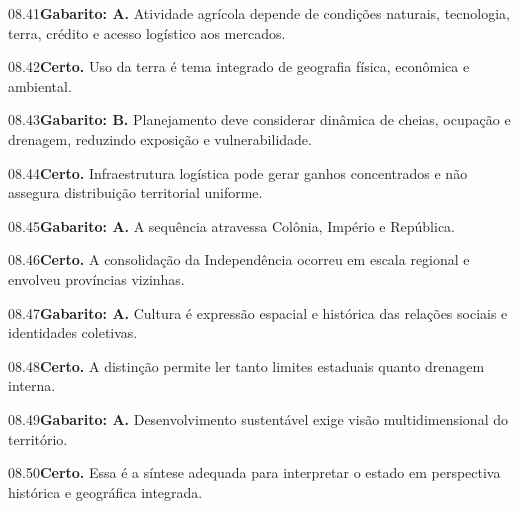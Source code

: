 \begin{solucao}{08.41}\textbf{Gabarito: A.} Atividade agrícola depende de condições naturais, tecnologia, terra, crédito e acesso logístico aos mercados.\end{solucao}
\begin{solucao}{08.42}\textbf{Certo.} Uso da terra é tema integrado de geografia física, econômica e ambiental.\end{solucao}
\begin{solucao}{08.43}\textbf{Gabarito: B.} Planejamento deve considerar dinâmica de cheias, ocupação e drenagem, reduzindo exposição e vulnerabilidade.\end{solucao}
\begin{solucao}{08.44}\textbf{Certo.} Infraestrutura logística pode gerar ganhos concentrados e não assegura distribuição territorial uniforme.\end{solucao}
\begin{solucao}{08.45}\textbf{Gabarito: A.} A sequência atravessa Colônia, Império e República.\end{solucao}
\begin{solucao}{08.46}\textbf{Certo.} A consolidação da Independência ocorreu em escala regional e envolveu províncias vizinhas.\end{solucao}
\begin{solucao}{08.47}\textbf{Gabarito: A.} Cultura é expressão espacial e histórica das relações sociais e identidades coletivas.\end{solucao}
\begin{solucao}{08.48}\textbf{Certo.} A distinção permite ler tanto limites estaduais quanto drenagem interna.\end{solucao}
\begin{solucao}{08.49}\textbf{Gabarito: A.} Desenvolvimento sustentável exige visão multidimensional do território.\end{solucao}
\begin{solucao}{08.50}\textbf{Certo.} Essa é a síntese adequada para interpretar o estado em perspectiva histórica e geográfica integrada.\end{solucao}
